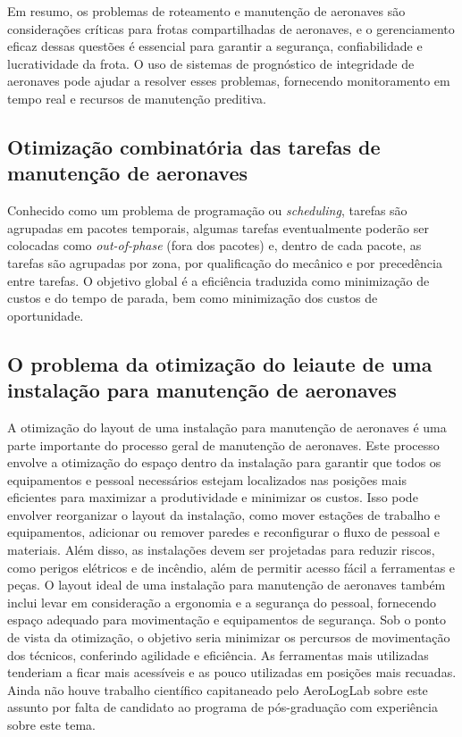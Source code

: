\documentclass{article}
\begin{document}
Em resumo, os problemas de roteamento e manutenção de aeronaves são considerações críticas para frotas compartilhadas de aeronaves, e o gerenciamento eficaz dessas questões é essencial para garantir a segurança, confiabilidade e lucratividade da frota. O uso de sistemas de prognóstico de integridade de aeronaves pode ajudar a resolver esses problemas, fornecendo monitoramento em tempo real e recursos de manutenção preditiva.

\subsection{Otimização combinatória das tarefas de manutenção de aeronaves}

Conhecido como um problema de programação ou {\it scheduling}, tarefas são agrupadas em pacotes temporais, algumas tarefas eventualmente poderão ser colocadas como {\it out-of-phase} (fora dos pacotes) e, dentro de cada pacote, as tarefas são agrupadas por zona, por qualificação do mecânico e por precedência entre tarefas.
O objetivo global é a eficiência traduzida como minimização de custos e do tempo de parada, bem como minimização dos custos de oportunidade.

\subsection{O problema da otimização do leiaute de uma instalação para manutenção de aeronaves}

A otimização do layout de uma instalação para manutenção de aeronaves é uma parte importante do processo geral de manutenção de aeronaves. Este processo envolve a otimização do espaço dentro da instalação para garantir que todos os equipamentos e pessoal necessários estejam localizados nas posições mais eficientes para maximizar a produtividade e minimizar os custos.
Isso pode envolver reorganizar o layout da instalação, como mover estações de trabalho e equipamentos, adicionar ou remover paredes e reconfigurar o fluxo de pessoal e materiais. Além disso, as instalações devem ser projetadas para reduzir riscos, como perigos elétricos e de incêndio, além de permitir acesso fácil a ferramentas e peças. O layout ideal de uma instalação para manutenção de aeronaves também inclui levar em consideração a ergonomia e a segurança do pessoal, fornecendo espaço adequado para movimentação e equipamentos de segurança.
Sob o ponto de vista da otimização, o objetivo seria minimizar os percursos de movimentação dos técnicos, conferindo agilidade e eficiência. As ferramentas mais utilizadas tenderiam a ficar mais acessíveis e as pouco utilizadas em posições mais recuadas.
Ainda não houve trabalho científico capitaneado pelo AeroLogLab sobre este assunto por falta de candidato ao programa de pós-graduação com experiência sobre este tema.
\end{document}
